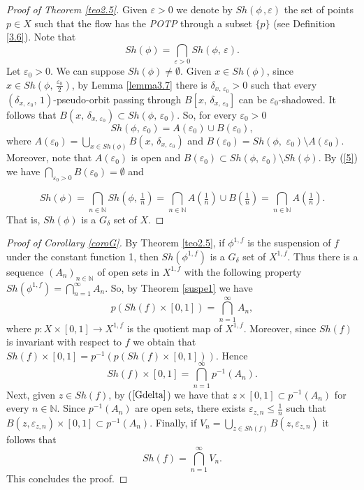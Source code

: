 \documentclass{amsart}
\theoremstyle{definition}
\newcommand{\ep}{\varepsilon}
\begin{document}
\begin{proof}[Proof of Theorem \ref{teo2.5}]

Given $\ep>0$ we denote by $Sh(\phi\,,\ep)$ the set of points $p\in X$ such that the flow has the {\em POTP} through a subset $\{p\}$ (see Definition \ref{3.6}). Note that 
\begin{equation}\label{5}
Sh(\phi)=\bigcap_{\ep>0}Sh(\phi,\,\ep).
\end{equation}
Let $\ep_0>0$. We can suppose $Sh(\phi)\neq \emptyset$. Given $x\in Sh(\phi)$, since $x\in Sh(\phi,\,\frac{\ep_0}{2})$, by Lemma \ref{lemma3.7} there is $\delta_{x,\,\ep_0} > 0$ such that every $(\delta_{x,\,\ep_0},\,1)$-pseudo-orbit passing through $B[x,\,\delta_{x,\,\ep_0} ]$ can be $\ep_0$-shadowed. It follows that $B(x,\,\delta_{x,\,\ep_0} )\subset Sh(\phi,\,\ep_0)$. So, for every $\ep_0>0$
$$Sh(\phi,\,\ep_0)=A(\ep_0)\cup B(\ep_0),$$
where $A(\ep_0)=\displaystyle{\bigcup_{x\in Sh(\phi)}}B(x,\,\delta_{x,\,\ep_0} )$ and $B(\ep_0)=Sh(\phi,\,\,\ep_0)\setminus A(\ep_0)$. Moreover, note that $A(\ep_0)$ is open and $B(\ep_0)\subset Sh(\phi,\,\ep_0)\setminus Sh(\phi)$. By (\ref{5}) we have $\displaystyle{\bigcap_{\ep_0>0}}B(\ep_0)=\emptyset$ and 

$$Sh(\phi)=\bigcap_{n\in\mathbb{N}}Sh(\phi,\,\tfrac{1}{n})=\bigcap_{n\in\mathbb{N}}A(\tfrac{1}{n})\cup B(\tfrac{1}{n})=\bigcap_{n\in\mathbb{N}}A(\tfrac{1}{n}).$$
That is, $Sh(\phi)$ is a $G_{\delta}$ set of $X$.
\end{proof}

\begin{proof}[Proof of Corollary \ref{coroG}]
By Theorem \ref{teo2.5}, if $\phi^{1,f}$ is the suspension of $f$ under the constant function 1, then $Sh(\phi^{1,f})$ is a $G_{\delta}$ set of $X^{1,f}$. Thus there is a sequence $(A_n)_{n\in \mathbb{N}}$ of open sets in $X^{1,f}$ with the following property $Sh(\phi^{1,f})=\bigcap_{n=1}^{\infty}A_n$. So, by Theorem \ref{suspe1} we have $$p(Sh(f)\times [0,1])=\bigcap_{n=1}^{\infty}A_n,$$
where $p:X\times [0,1]\rightarrow X^{1,f}$ is the quotient map of $X^{1,f}$. Moreover, since $Sh(f)$ is invariant with respect to $f$ we obtain that $Sh(f)\times [0,1]=p^{-1}(p(Sh(f)\times [0,1]))$. Hence \begin{equation}\label{Gdelta}
Sh(f)\times [0,1]=\bigcap_{n=1}^{\infty}p^{-1}(A_n).
\end{equation}
Next, given $z\in Sh(f)$, by ($\ref{Gdelta}$) we have that $z\times [0,1]\subset p^{-1}(A_n)$ for every $n\in\mathbb{N}$. Since $p^{-1}(A_n)$ are open sets, there exists $\varepsilon_{z,n}\leq \frac{1}{n}$ such that $B(z,\varepsilon_{z,n})\times [0,1]\subset p^{-1}(A_n)$. Finally, if $V_n=\bigcup_{z\in Sh(f)}B(z,\varepsilon_{z,n})$ it follows that
$$Sh(f)=\bigcap_{n=1}^{\infty}V_n.$$
This concludes the proof.
\end{proof}
\end{document}
